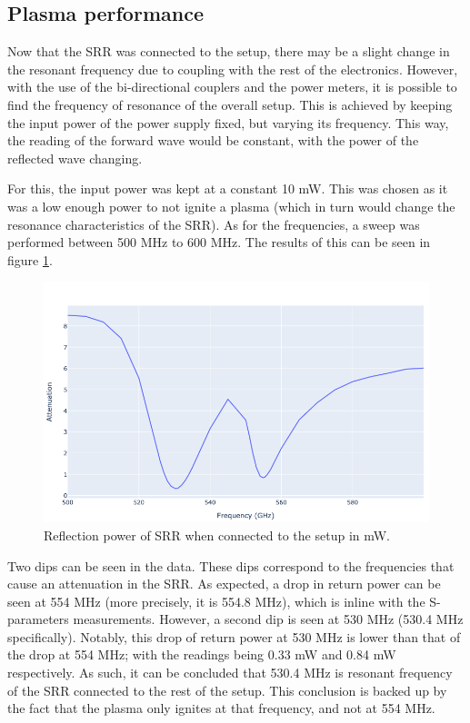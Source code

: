 \subsection{Plasma performance}

Now that the SRR was connected to the setup, there may be a slight change in the resonant frequency due to coupling with the rest of the electronics. However, with the use of the bi-directional couplers and the power meters, it is possible to find the frequency of resonance of the overall setup. This is achieved by keeping the input power of the power supply fixed, but varying its frequency. This way, the reading of the forward wave would be constant, with the power of the reflected wave changing. 

For this, the input power was kept at a constant 10 mW. This was chosen as it was a low enough power to not ignite a plasma (which in turn would change the resonance characteristics of the SRR). As for the frequencies, a sweep was performed between 500 MHz to 600 MHz. The results of this can be seen in figure \ref{fig:reflected_power_SRR.png}. 

\begin{figure}[h!]
	\centering
	\includegraphics[width=\linewidth]{chapter_4/figures/reflected_power_SRR.png}
	\caption{Reflection power of SRR when connected to the setup in mW.}
	\label{fig:reflected_power_SRR.png}
\end{figure}

Two dips can be seen in the data. These dips correspond to the frequencies that cause an attenuation in the SRR. As expected, a drop in return power can be seen at 554 MHz (more precisely, it is 554.8 MHz), which is inline with the S-parameters measurements. However, a second dip is seen at 530 MHz (530.4 MHz specifically). Notably, this drop of return power at 530 MHz is lower than that of the drop at 554 MHz; with the readings being 0.33 mW and 0.84 mW respectively. As such, it can be concluded that 530.4 MHz is resonant frequency of the SRR connected to the rest of the setup. This conclusion is backed up by the fact that the plasma only ignites at that frequency, and not at 554 MHz.


